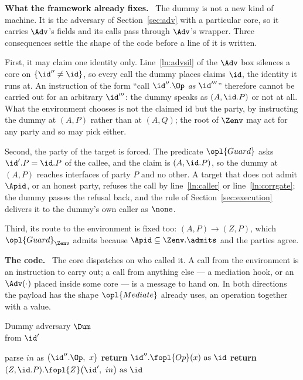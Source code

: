 \documentclass[10pt,oneside,openany]{book}
\newcommand{\heading}[1]{\medskip\par\noindent\textcolor{accent}{\textbf{#1.}}\ }
\theoremstyle{accentdef}
\theoremstyle{accentplain}
\begin{document}
\heading{What the framework already fixes} The dummy is not a new kind of machine. It is the
adversary of Section~\ref{sec:adv} with a particular core, so it carries $\Adv$'s fields and its
calls pass through $\Adv$'s wrapper. Three consequences settle the shape of the code before a line
of it is written.

First, it may claim one identity only. Line~\ref{ln:advsil} of the $\Adv$ box silences a core on
$\{\id'' \ne \id\}$, so every call the dummy places claims $\id$, the identity it runs at. An
instruction of the form ``call $\id''.\Op$ \emph{as} $\id'''$'' therefore cannot be carried out
for an arbitrary $\id'''$: the dummy speaks as $(A,\id.P)$ or not at all. What the environment
chooses is not the claimed id but the party, by instructing the dummy at $(A,P)$ rather than at
$(A,Q)$; the root of $\Zenv$ may act for any party and so may pick either.

Second, the party of the target is forced. The predicate $\opl{Guard}$ asks $\id'.P = \id.P$ of the callee, and
the claim is $(A,\id.P)$, so the dummy at $(A,P)$ reaches interfaces of party $P$ and no other. A
target that does not admit $\Apid$, or an honest party, refuses the call by
line~\ref{ln:caller} or line~\ref{ln:corrgate}; the dummy passes the refusal back, and the rule
of Section~\ref{sec:execution} delivers it to the dummy's own caller as $\none$.

Third, its route to the environment is fixed too: $(A,P) \to (Z,P)$, which
$\opl{Guard}_{\Zenv}$ admits because $\Apid \subseteq \Zenv.\admits$ and the parties agree.

\heading{The code} The core dispatches on who called it. A call from the environment is an
instruction to carry out; a call from anything else --- a mediation hook, or an $\Adv(\cdot)$
placed inside some core --- is a message to hand on. In both directions the payload has the shape
$\opl{Mediate}$ already uses, an operation together with a value.

\begin{interface}{Dummy adversary $\Dum$ \\
}
 \quad from $\id'$
\begin{algorithmic}[1]
  \State parse $in$ as $\bigl(\id''.\Op,\ x\bigr)$ \label{ln:dumparse}
  \State \textbf{return} $\id''.\fopl{Op}(x) \text{ as } \id$ \label{ln:dumout}
\Else
  \State \textbf{return} $(Z,\id.P).\fopl{Z}\bigl(\id',\ in\bigr) \text{ as } \id$ \label{ln:dumin}
\EndIf
\end{algorithmic}
\end{interface}
\end{document}
